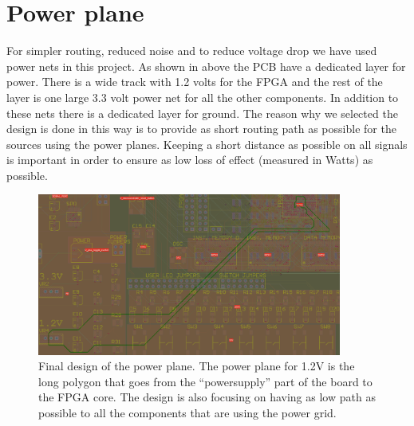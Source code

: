 \section {Power plane}



For simpler routing, reduced noise and to reduce voltage drop we have used power nets in this project.
As shown in above the PCB have a dedicated layer for power.
There is a wide track with 1.2 volts for the FPGA and the rest of the layer is one large 3.3 volt power net for all the other components.
In addition to these nets there is a dedicated layer for ground. The reason why we selected the design is done in this way is to provide as short routing path as possible for the sources using the power planes.
Keeping a short distance as possible on all signals is important in order to ensure as low loss of effect (measured in Watts) as possible.

\begin{figure}
\centering
\includegraphics[width=10cm,keepaspectratio]{pcb/powerplanephoto.png}
\caption{Final design of the power plane. The power plane for 1.2V is the long polygon that goes from the ``powersupply'' part of the board to the FPGA core. The
design is also focusing on having as low path as possible to all the components that are using the power grid.  }
\label{figure:powerplanephoto}
\end{figure}